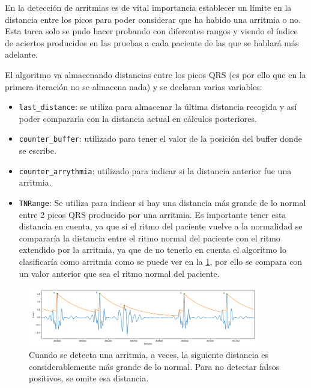 En la detección de arritmias es de vital importancia establecer un límite en la distancia entre los picos
para poder considerar que ha habido una arritmia o no. Esta tarea solo se pudo hacer probando con diferentes
rangos y viendo el índice de aciertos producidos en las pruebas a cada paciente de las que se hablará más adelante. 

El algoritmo va almacenando distancias entre los picos QRS (es por ello que en la primera iteración no se almacena nada)
y se declaran varias variables:

\begin{itemize}
    \item \texttt{last\_distance}: se utiliza para almacenar la última distancia recogida y así poder compararla con la distancia 
    actual en cálculos posteriores.
    \item \texttt{counter\_buffer}: utilizado para tener el valor de la posición del buffer donde se escribe.
    \item \texttt{counter\_arrythmia}: utilizado para indicar si la distancia anterior fue una arritmia.
    \item \texttt{TNRange}: Se utiliza para indicar si hay una distancia más grande de lo normal entre 2 picos QRS producido
    por una arritmia. Es importante tener esta distancia en cuenta, ya que si el ritmo del paciente vuelve a la
    normalidad se compararía la distancia entre el ritmo normal del paciente con el ritmo extendido por la arritmia,
    ya que de no tenerlo en cuenta el algoritmo lo clasificaría como arritmia como se puede ver en la \cref{fig:senial_explicacion_TNRANGE}, por ello se compara con un valor anterior
    que sea el ritmo normal del paciente.
\end{itemize}

\begin{figure}[h!]
    \centering
    \includegraphics[width=0.9\textwidth]{./Images/img_algoritmo/senial_explicacion_TNRANGE.png}
    \caption{Cuando se detecta una arritmia, a veces, la siguiente distancia es considerablemente más grande de lo normal. Para no detectar falsos positivos, se omite esa distancia.}
    \label{fig:senial_explicacion_TNRANGE}
\end{figure}

